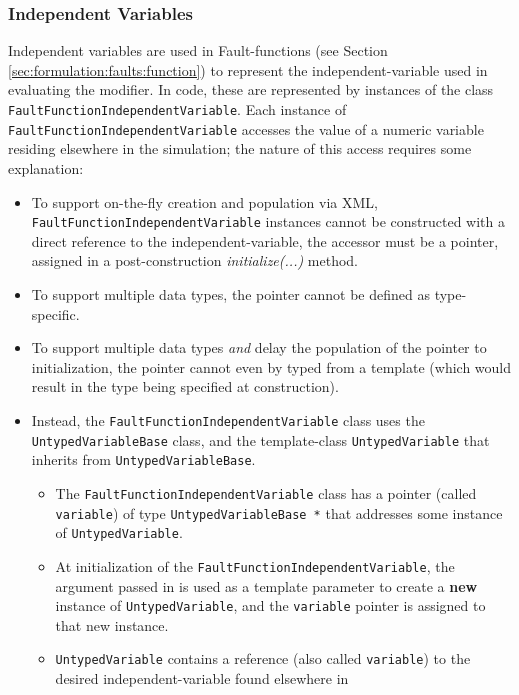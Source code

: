 \documentclass[11pt,fleqn]{report}
\begin{document}
\subsubsection{Independent Variables} \label{sec:formulation:indep_var}
Independent variables are used in Fault-functions (see Section
\ref{sec:formulation:faults:function}) to represent the independent-variable
used in evaluating the modifier. In code, these are represented by instances of
the class \verb"FaultFunctionIndependentVariable".
Each instance of \verb"FaultFunctionIndependentVariable" accesses the value of a
numeric
variable residing elsewhere in the simulation; the nature of this access
requires some explanation:
\begin{itemize}
  \item To support on-the-fly creation and population via XML,
    \verb"FaultFunctionIndependentVariable" instances cannot be constructed with
    a direct
    reference to the independent-variable, the accessor must be a pointer,
    assigned in a post-construction \textit{initialize(...)} method.
  \item To support multiple data types, the pointer cannot be defined as
    type-specific.
  \item To support multiple data types \textit{and} delay the population of the
    pointer to initialization, the pointer cannot even by typed from a template
    (which would result in the type being specified at construction).
  \item Instead, the \verb"FaultFunctionIndependentVariable" class uses the
    \verb"UntypedVariableBase" class, and the template-class
    \verb"UntypedVariable" that inherits from \verb'UntypedVariableBase'.
    \begin{itemize}
      \item The \verb"FaultFunctionIndependentVariable" class has a pointer
        (called \verb'variable') of type \newline
        \verb'UntypedVariableBase *'
        that addresses some instance of
        \verb'UntypedVariable'.
      \item At initialization of the \verb"FaultFunctionIndependentVariable",
        the argument
        passed in is used as a template
        parameter to create a \textbf{new} instance of \verb'UntypedVariable',
        and the \verb'variable' pointer is assigned to that new
        instance.
      \item \verb'UntypedVariable' contains a reference (also called
        \verb'variable') to the desired independent-variable found elsewhere in

\end{itemize}
\end{itemize}
\end{document}
